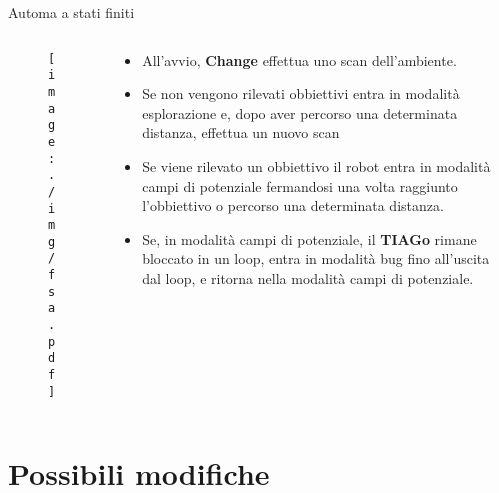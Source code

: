 \documentclass[10pt]{beamer}
\begin{document}
	\begin{frame}{Automa a stati finiti}
	\begin{columns}
		\begin{column}{0.3\textwidth}
			\begin{figure}[H]
				\hfuzz=42pt 
				\centering
				\texttt{[image: ./img/fsa.pdf]}
				\label{fig:fsa}
			\end{figure}
		\end{column}	
		\begin{column}{0.7\textwidth}
		\justifying
		\begin{itemize}[<+->]
			\item All'avvio, \textbf{Change} effettua uno scan dell'ambiente.
			\item Se non vengono rilevati obbiettivi entra in modalità
				esplorazione e, dopo aver percorso una determinata distanza,
				effettua un nuovo scan
			\item Se viene rilevato un obbiettivo il robot entra in modalità
				campi di potenziale fermandosi una volta raggiunto l'obbiettivo
				o percorso una determinata distanza.
			\item Se, in modalità campi di potenziale, il \textbf{TIAGo} rimane
				bloccato in un loop, entra in modalità bug fino all'uscita dal loop, e ritorna nella modalità campi di
				potenziale.
		\end{itemize}
		\end{column}
	\end{columns}	
	\end{frame}
	
	\section{Possibili modifiche}\label{sec:Possibli-modifiche}
	\frame{\sectionpage}
\end{document}
